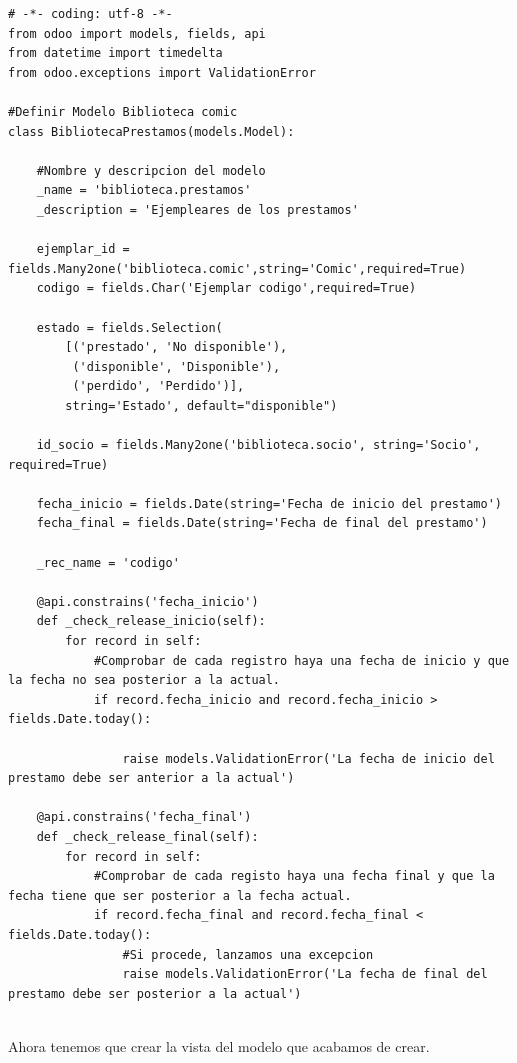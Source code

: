 \documentclass[a4paper,12pt]{article}
\begin{document}
\vspace{0.5cm}
\begin{lstlisting}[style=javascript]
# -*- coding: utf-8 -*-
from odoo import models, fields, api
from datetime import timedelta
from odoo.exceptions import ValidationError

#Definir Modelo Biblioteca comic
class BibliotecaPrestamos(models.Model):

    #Nombre y descripcion del modelo
    _name = 'biblioteca.prestamos'
    _description = 'Ejempleares de los prestamos'

    ejemplar_id = fields.Many2one('biblioteca.comic',string='Comic',required=True)
    codigo = fields.Char('Ejemplar codigo',required=True)

    estado = fields.Selection(
        [('prestado', 'No disponible'),
         ('disponible', 'Disponible'),
         ('perdido', 'Perdido')],
        string='Estado', default="disponible")

    id_socio = fields.Many2one('biblioteca.socio', string='Socio', required=True)

    fecha_inicio = fields.Date(string='Fecha de inicio del prestamo')
    fecha_final = fields.Date(string='Fecha de final del prestamo')

    _rec_name = 'codigo'

    @api.constrains('fecha_inicio')
    def _check_release_inicio(self):
        for record in self:
            #Comprobar de cada registro haya una fecha de inicio y que la fecha no sea posterior a la actual.
            if record.fecha_inicio and record.fecha_inicio > fields.Date.today():
    
                raise models.ValidationError('La fecha de inicio del prestamo debe ser anterior a la actual')
    
    @api.constrains('fecha_final')
    def _check_release_final(self):
        for record in self:
            #Comprobar de cada registo haya una fecha final y que la fecha tiene que ser posterior a la fecha actual.
            if record.fecha_final and record.fecha_final < fields.Date.today():
                #Si procede, lanzamos una excepcion
                raise models.ValidationError('La fecha de final del prestamo debe ser posterior a la actual')


\end{lstlisting} 

Ahora tenemos que crear la vista del modelo que acabamos de crear.
\end{document}
